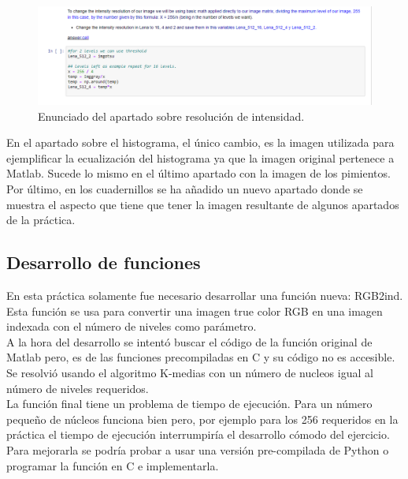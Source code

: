 \documentclass[a4paper,12pt]{report}
\begin{document}
\begin{figure}[h]
\centering
\includegraphics[width=1\textwidth]{imagenes/resolucionmatematica}
\caption{Enunciado del apartado sobre resolución de intensidad.}
\label{resmatematica}
\end{figure}

En el apartado sobre el histograma, el único cambio, es la imagen utilizada para ejemplificar la ecualización del histograma ya que la imagen original pertenece a Matlab. Sucede lo mismo en el último apartado con la imagen de los pimientos.\\

Por último, en los cuadernillos se ha añadido un nuevo apartado donde se muestra el aspecto que tiene que tener la imagen resultante de algunos apartados de la práctica.

\subsection{Desarrollo de funciones}

En esta práctica solamente fue necesario desarrollar una función nueva: RGB2ind. Esta función se usa para convertir una imagen true color RGB en una imagen indexada con el número de niveles como parámetro. \\

A la hora del desarrollo se intentó buscar el código de la función original de Matlab pero, es de las funciones precompiladas en C y su código no es accesible. Se resolvió usando el algoritmo K-medias con un número de nucleos igual al número de niveles requeridos.\\

 La función final tiene un problema de tiempo de ejecución. Para un número pequeño de núcleos funciona bien pero, por ejemplo para los 256 requeridos en la práctica el tiempo de ejecución interrumpiría el desarrollo cómodo del ejercicio. Para mejorarla se podría probar a usar una versión pre-compilada de Python o programar la función en C e implementarla.\\
\end{document}
